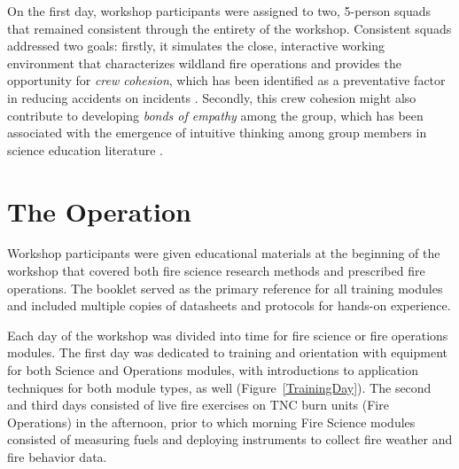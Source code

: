 \documentclass[fire,casereport,accept,moreauthors,pdftex]{Definitions/mdpi}  %
\begin{document}
On the first day, workshop participants were assigned to two, 5-person squads that remained consistent through the entirety of the workshop.
Consistent squads addressed two goals: firstly, it simulates the close, interactive working environment that characterizes wildland fire operations and provides the opportunity for \emph{crew cohesion}, which has been identified as a preventative factor in reducing accidents on incidents \citep{mcdonald2003}.
Secondly, this crew cohesion might also contribute to developing \emph{bonds of empathy} among the group, which has been associated with the emergence of intuitive thinking among group members in science education literature \citep{park2020}.

\section{The Operation}

Workshop participants were given educational materials at the beginning of the workshop that covered both fire science research methods and prescribed fire operations.
The booklet served as the primary reference for all training modules and included multiple copies of datasheets and protocols for hands-on experience.

Each day of the workshop was divided into time for fire science or fire operations modules.
The first day was dedicated to training and orientation with equipment for both Science and Operations modules, with introductions to application techniques for both module types, as well (Figure~\ref{TrainingDay}).
The second and third days consisted of live fire exercises on TNC burn units (Fire Operations) in the afternoon, prior to which morning Fire Science modules consisted of measuring fuels and deploying instruments to collect fire weather and fire behavior data.
\end{document}
